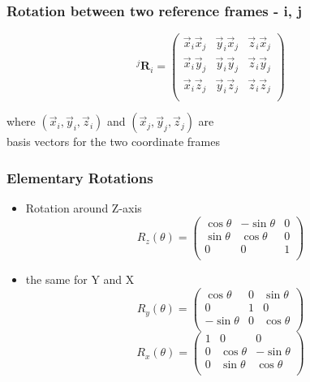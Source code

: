 \documentclass[10pt]{beamer}
\begin{document}
\begin{frame}
  \frametitle{Rotation between two reference frames - i, j}
  \[
    ^{j}\mathbf{R}_i = \left(
      \begin{array}{ccc}
        \vec{x}_i \vec{x}_j & \vec{y}_i \vec{x}_j & \vec{z}_i \vec{x}_j \\
        \vec{x}_i \vec{y}_j & \vec{y}_i \vec{y}_j & \vec{z}_i \vec{y}_j \\
        \vec{x}_i \vec{z}_j & \vec{y}_i \vec{z}_j & \vec{z}_i \vec{z}_j \\
      \end{array}
    \right)
  \]

  \vspace{1cm}
  \begin{center}
    where $(\vec{x}_i, \vec{y}_i, \vec{z}_i)$ and $(\vec{x}_j, \vec{y}_j, \vec{z}_j)$ are \\
    basis vectors for the two coordinate frames
  \end{center}
\end{frame}

\begin{frame}
  \frametitle{Elementary Rotations}
  \begin{itemize}
  \item Rotation around Z-axis
    \[
      R_z(\theta) = \left(
        \begin{array}{ccc}
          \cos \theta &  -\sin \theta & 0 \\
          \sin \theta &   \cos \theta & 0 \\
          0           &             0 & 1 \\
        \end{array}
      \right)
    \]
    \pause 
  \item the same for Y and X
    \[
      R_y(\theta) = \left(
        \begin{array}{ccc}
          \cos \theta  &  0 & \sin \theta  \\
          0             &  1 &   0 \\
          - \sin \theta &  0 &   \cos \theta  \\
        \end{array}
      \right)
    \]
    \[
      R_x(\theta) = \left(
        \begin{array}{ccc}
          1 &  0 &   0 \\
          0 & \cos \theta  &  - \sin \theta  \\
          0 & \sin \theta  &    \cos \theta  \\
        \end{array}
      \right)
    \]
  \end{itemize}
\end{frame}
\end{document}
